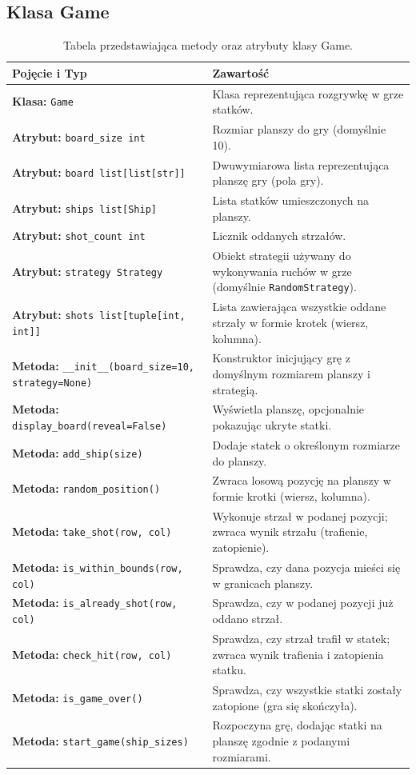 \documentclass[magisterska]{pracadypl}
\begin{document}
\subsection{Klasa Game}
\begin{table}[H]
\centering
\begin{tabularx}{\textwidth}{|p{6cm}|X|}
\hline
\textbf{Pojęcie i Typ} & \textbf{Zawartość} \\ \hline
\textbf{Klasa:} \texttt{Game} & Klasa reprezentująca rozgrywkę w grze statków. \\ \hline
\textbf{Atrybut:} \texttt{board\_size int} & Rozmiar planszy do gry (domyślnie 10). \\ \hline
\textbf{Atrybut:} \texttt{board list[list[str]]} & Dwuwymiarowa lista reprezentująca planszę gry (pola gry). \\ \hline
\textbf{Atrybut:} \texttt{ships list[Ship]} & Lista statków umieszczonych na planszy. \\ \hline
\textbf{Atrybut:} \texttt{shot\_count int} & Licznik oddanych strzałów. \\ \hline
\textbf{Atrybut:} \texttt{strategy Strategy} & Obiekt strategii używany do wykonywania ruchów w grze (domyślnie \texttt{RandomStrategy}). \\ \hline
\textbf{Atrybut:} \texttt{shots list[tuple[int, int]]} & Lista zawierająca wszystkie oddane strzały w formie krotek (wiersz, kolumna). \\ \hline
\textbf{Metoda:} \texttt{\_\_init\_\_(board\_size=10, strategy=None)} & Konstruktor inicjujący grę z domyślnym rozmiarem planszy i strategią. \\ \hline
\textbf{Metoda:} \texttt{display\_board(reveal=False)} & Wyświetla planszę, opcjonalnie pokazując ukryte statki. \\ \hline
\textbf{Metoda:} \texttt{add\_ship(size)} & Dodaje statek o określonym rozmiarze do planszy. \\ \hline
\textbf{Metoda:} \texttt{random\_position()} & Zwraca losową pozycję na planszy w formie krotki (wiersz, kolumna). \\ \hline
\textbf{Metoda:} \texttt{take\_shot(row, col)} & Wykonuje strzał w podanej pozycji; zwraca wynik strzału (trafienie, zatopienie). \\ \hline
\textbf{Metoda:} \texttt{is\_within\_bounds(row, col)} & Sprawdza, czy dana pozycja mieści się w granicach planszy. \\ \hline
\textbf{Metoda:} \texttt{is\_already\_shot(row, col)} & Sprawdza, czy w podanej pozycji już oddano strzał. \\ \hline
\textbf{Metoda:} \texttt{check\_hit(row, col)} & Sprawdza, czy strzał trafił w statek; zwraca wynik trafienia i zatopienia statku. \\ \hline
\textbf{Metoda:} \texttt{is\_game\_over()} & Sprawdza, czy wszystkie statki zostały zatopione (gra się skończyła). \\ \hline
\textbf{Metoda:} \texttt{start\_game(ship\_sizes)} & Rozpoczyna grę, dodając statki na planszę zgodnie z podanymi rozmiarami. \\ \hline
\end{tabularx}
\caption{Tabela przedstawiająca metody oraz atrybuty klasy Game.}
\end{table}
\end{document}
